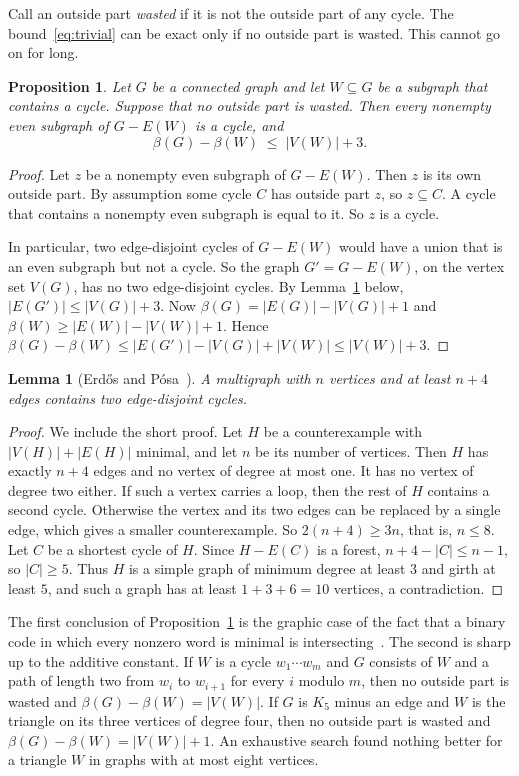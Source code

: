 \documentclass[11pt]{article}
\newtheorem{lemma}[theorem]{Lemma}
\newtheorem{proposition}[theorem]{Proposition}
\theoremstyle{definition}
\theoremstyle{remark}
\numberwithin{equation}{section}
\begin{document}
Call an outside part \emph{wasted} if it is not the outside part of any cycle. The
bound~\eqref{eq:trivial} can be exact only if no outside part is wasted. This cannot go on for
long.

\begin{proposition}\label{prop:nowaste}
Let $G$ be a connected graph and let $W\subseteq G$ be a subgraph that contains a cycle. Suppose
that no outside part is wasted. Then every nonempty even subgraph of $G-E(W)$ is a cycle, and
\[
  \beta(G)-\beta(W)\;\le\;|V(W)|+3 .
\]
\end{proposition}

\begin{proof}
Let $z$ be a nonempty even subgraph of $G-E(W)$. Then $z$ is its own outside part. By assumption
some cycle $C$ has outside part $z$, so $z\subseteq C$. A cycle that contains a nonempty even
subgraph is equal to it. So $z$ is a cycle.

In particular, two edge-disjoint cycles of $G-E(W)$ would have a union that is an even subgraph but
not a cycle. So the graph $G'=G-E(W)$, on the vertex set $V(G)$, has no two edge-disjoint cycles.
By Lemma~\ref{lem:EP} below, $|E(G')|\le|V(G)|+3$. Now $\beta(G)=|E(G)|-|V(G)|+1$ and
$\beta(W)\ge|E(W)|-|V(W)|+1$. Hence
$\beta(G)-\beta(W)\le|E(G')|-|V(G)|+|V(W)|\le|V(W)|+3$.
\end{proof}

\begin{lemma}[Erd\H{o}s and P\'osa~\cite{EP}]\label{lem:EP}
A multigraph with $n$ vertices and at least $n+4$ edges contains two edge-disjoint cycles.
\end{lemma}

\begin{proof}
We include the short proof. Let $H$ be a counterexample with $|V(H)|+|E(H)|$ minimal, and let $n$
be its number of vertices. Then $H$ has exactly $n+4$ edges and no vertex of degree at most one. It
has no vertex of degree two either. If such a vertex carries a loop, then the rest of $H$ contains a
second cycle. Otherwise the vertex and its two edges can be replaced by a single edge, which gives a
smaller counterexample. So
$2(n+4)\ge3n$, that is, $n\le8$. Let $C$ be a shortest cycle of $H$. Since $H-E(C)$ is a forest,
$n+4-|C|\le n-1$, so $|C|\ge5$. Thus $H$ is a simple graph of minimum degree at least $3$ and girth
at least $5$, and such a graph has at least $1+3+6=10$ vertices, a contradiction.
\end{proof}

The first conclusion of Proposition~\ref{prop:nowaste} is the graphic case of the fact that a binary
code in which every nonzero word is minimal is intersecting~\cite[\S2]{AACST}. The second is sharp up
to the additive constant. If $W$ is a cycle $w_1\cdots w_m$ and $G$ consists of $W$ and a path of
length two from $w_i$ to $w_{i+1}$ for every $i$ modulo $m$, then no outside part is wasted and
$\beta(G)-\beta(W)=|V(W)|$. If $G$ is $K_5$ minus an edge and $W$ is the triangle on its three
vertices of degree four, then no outside part is wasted and $\beta(G)-\beta(W)=|V(W)|+1$. An exhaustive
search found nothing better for a triangle $W$ in graphs with at most eight vertices.
\end{document}
